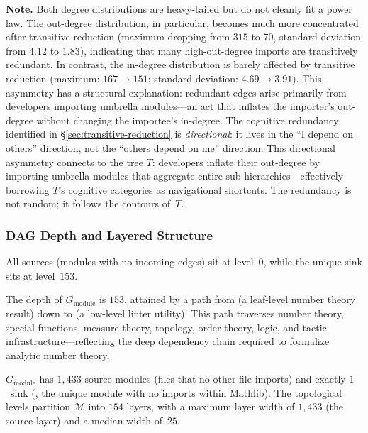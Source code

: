 \noindent\textbf{Note.}
Both degree distributions are heavy-tailed but do not cleanly fit a power law. The out-degree distribution, in particular, becomes much more concentrated after transitive reduction (maximum dropping from $315$ to $70$, standard deviation from $4.12$ to $1.83$), indicating that many high-out-degree imports are transitively redundant.
In contrast, the in-degree distribution is barely affected by transitive reduction (maximum: $167 \to 151$; standard deviation: $4.69 \to 3.91$). This asymmetry has a structural explanation: redundant edges arise primarily from developers importing umbrella modules---an act that inflates the importer's out-degree without changing the importee's in-degree. The cognitive redundancy identified in \S\ref{sec:transitive-reduction} is \emph{directional}: it lives in the ``I depend on others'' direction, not the ``others depend on me'' direction.
This directional asymmetry connects to the tree $T$: developers inflate their out-degree by importing umbrella modules that aggregate entire sub-hierarchies---effectively borrowing $T$'s cognitive categories as navigational shortcuts. The redundancy is not random; it follows the contours of~$T$.

\subsubsection{DAG Depth and Layered Structure}
\label{sec:dag-depth}

All sources (modules with no incoming edges) sit at level~$0$, while the unique sink  sits at level~$153$.

The depth of $G_{\mathrm{module}}$ is $153$, attained by a path from  (a leaf-level number theory result) down to  (a low-level linter utility). This path traverses number theory, special functions, measure theory, topology, order theory, logic, and tactic infrastructure---reflecting the deep dependency chain required to formalize analytic number theory.

$G_{\mathrm{module}}$ has $1{,}433$ source modules (files that no other  file imports) and exactly $1$~sink (, the unique module with no imports within Mathlib). The topological levels partition $\mathcal{M}$ into $154$ layers, with a maximum layer width of $1{,}433$ (the source layer) and a median width of~$25$.

